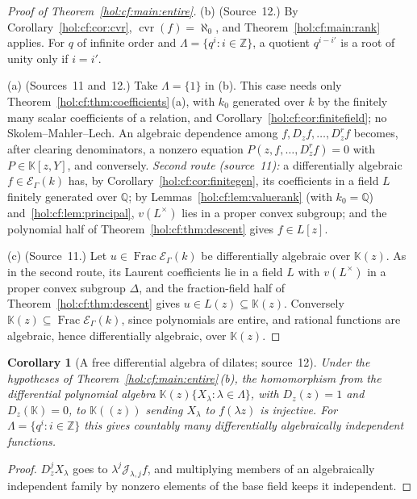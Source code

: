 \documentclass[11pt]{article}
\numberwithin{equation}{section}
\newtheorem{corollary}[theorem]{Corollary}
\theoremstyle{definition}
\theoremstyle{remark}
\newcommand{\Q}{\mathbb Q}
\newcommand{\Z}{\mathbb Z}
\newcommand{\KK}{\mathbb K}
\newcommand{\EK}{\mathcal E_\Gamma(k)}
\newcommand{\FE}{\operatorname{Frac}\EK}
\newcommand{\cvr}{\operatorname{cvr}}
\newcommand{\jet}[2]{\mathcal J_{#1,#2}}
\begin{document}
\begin{proof}[Proof of Theorem~\ref{hol:cf:main:entire}]
(b) (Source~12.) By Corollary~\ref{hol:cf:cor:cvr}, $\cvr(f)=\aleph_0$, and
Theorem~\ref{hol:cf:main:rank} applies. For $q$ of infinite order and
$\Lambda=\{q^i:i\in\Z\}$, a quotient $q^{i-i'}$ is a root of unity only if
$i=i'$.

(a) (Sources~11 and~12.) Take $\Lambda=\{1\}$ in (b). This case needs only
Theorem~\ref{hol:cf:thm:coefficients}\,(a), with $k_0$ generated over $k$ by
the finitely many scalar coefficients of a relation, and
Corollary~\ref{hol:cf:cor:finitefield}; no Skolem--Mahler--Lech. An
algebraic dependence among $f,D_zf,\ldots,D_z^rf$ becomes, after clearing
denominators, a nonzero equation $P(z,f,\ldots,D_z^rf)=0$ with $P\in\KK[z,Y]$,
and conversely. \emph{Second route (source~11):} a differentially algebraic
$f\in\EK$ has, by Corollary~\ref{hol:cf:cor:finitegen}, its coefficients in a
field $L$ finitely generated over $\Q$; by
Lemmas~\ref{hol:cf:lem:valuerank} (with $k_0=\Q$)
and~\ref{hol:cf:lem:principal}, $v(L^\times)$ lies in a proper convex
subgroup; and the polynomial half of Theorem~\ref{hol:cf:thm:descent} gives
$f\in L[z]$.

(c) (Source~11.) Let $u\in\FE$ be differentially algebraic over $\KK(z)$. As
in the second route, its Laurent coefficients lie in a field $L$ with
$v(L^\times)$ in a proper convex subgroup $\Delta$, and the fraction-field
half of Theorem~\ref{hol:cf:thm:descent} gives $u\in L(z)\subseteq\KK(z)$.
Conversely $\KK(z)\subseteq\FE$, since polynomials are entire, and rational
functions are algebraic, hence differentially algebraic, over $\KK(z)$.
\end{proof}

\begin{corollary}[A free differential algebra of dilates; source~12]
\label{hol:cf:cor:free}
Under the hypotheses of Theorem~\ref{hol:cf:main:entire}\,(b), the
homomorphism from the differential polynomial algebra
$\KK(z)\{X_\lambda:\lambda\in\Lambda\}$, with $D_z(z)=1$ and $D_z(\KK)=0$, to
$\KK((z))$ sending $X_\lambda$ to $f(\lambda z)$ is injective. For
$\Lambda=\{q^i:i\in\Z\}$ this gives countably many differentially
algebraically independent functions.
\end{corollary}

\begin{proof}
$D_z^jX_\lambda$ goes to $\lambda^j\jet\lambda jf$, and multiplying members of
an algebraically independent family by nonzero elements of the base field
keeps it independent.
\end{proof}
\end{document}
